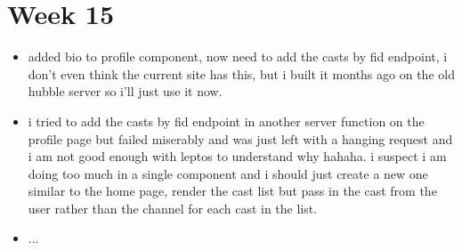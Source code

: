 \newpage
\section{Week 15}

\begin{itemize}
    \item added bio to profile component, now need to add the casts by fid
        endpoint, i don't even think the current site has this, but i built it
        months ago on the old hubble server so i'll just use it now.
    \item i tried to add the casts by fid endpoint in another server function on
        the profile page but failed miserably and was just left with a hanging
        request and i am not good enough with leptos to understand why hahaha. i
        suspect i am doing too much in a single component and i should just
        create a new one similar to the home page, render the cast list but pass
        in the cast from the user rather than the channel for each cast in the
        list.
    \item ...
\end{itemize}
